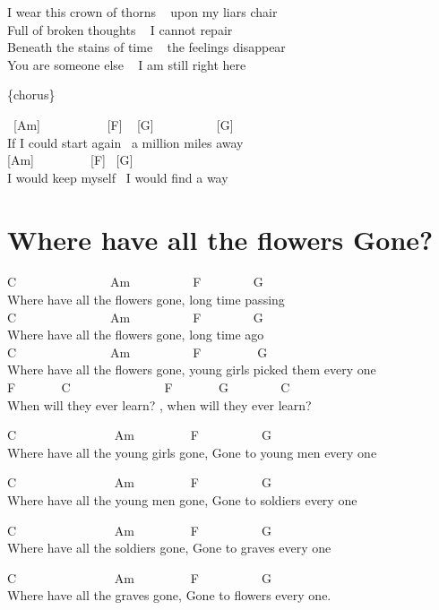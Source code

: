\documentclass[
  letterpaper,
]{scrbook}
\begin{document}
I wear this crown of thorns ~ upon my liar\textquotesingle s chair\\
Full of broken thoughts ~ I cannot repair\\
Beneath the stains of time ~ the feelings disappear\\
You are someone else ~ I am still right here

\{chorus\}

~{[}Am{]} ~ ~ ~ ~ ~ ~ {[}F{]} ~ {[}G{]} ~ ~ ~ ~ ~ ~{[}G{]}\\
If I could start again ~a million miles away\\
{[}Am{]} ~ ~ ~ ~ ~ {[}F{]} ~{[}G{]}\\
I would keep myself ~I would find a way

\hypertarget{where-have-all-the-flowers-gone}{%
\chapter{Where have all the flowers
Gone?}\label{where-have-all-the-flowers-gone}}

C ~ ~ ~ ~ ~ ~ ~ ~ ~Am ~ ~ ~ ~ ~ ~F ~ ~ ~ ~ ~G\\
Where have all the flowers gone, long time passing\\
C ~ ~ ~ ~ ~ ~ ~ ~ ~Am ~ ~ ~ ~ ~ ~F ~ ~ ~ ~ ~G\\
Where have all the flowers gone, long time ago\\
C ~ ~ ~ ~ ~ ~ ~ ~ ~Am ~ ~ ~ ~ ~ ~F ~ ~ ~ ~ ~ G\\
Where have all the flowers gone, young girls picked them every one\\
F ~ ~ ~ ~ C ~ ~ ~ ~ ~ ~ ~ ~ ~F ~ ~ ~ ~ G ~ ~ ~ ~ ~C ~\\
When will they ever learn? , when will they ever learn?

C ~ ~ ~ ~ ~ ~ ~ ~ ~ Am ~ ~ ~ ~ ~ F ~ ~ ~ ~ ~ ~G\\
Where have all the young girls gone, Gone to young men every one

C ~ ~ ~ ~ ~ ~ ~ ~ ~ Am ~ ~ ~ ~ ~ F ~ ~ ~ ~ ~ ~G\\
Where have all the young men gone, Gone to soldiers every one

C ~ ~ ~ ~ ~ ~ ~ ~ ~ Am ~ ~ ~ ~ ~ F ~ ~ ~ ~ ~ ~G ~\\
Where have all the soldiers gone, Gone to graves every one

C ~ ~ ~ ~ ~ ~ ~ ~ ~ Am ~ ~ ~ ~ ~ F ~ ~ ~ ~ ~ ~G ~\\
Where have all the graves gone, Gone to flowers every one.
\end{document}

